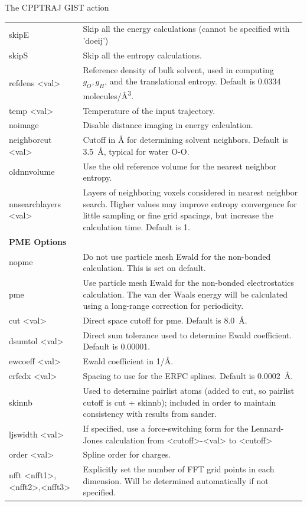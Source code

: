 \documentclass[9pt,tutorial,pubversion]{livecoms}
\begin{document}
\begin{Checklists*}[h!]
\begin{checklist}{The CPPTRAJ GIST action}
\begin{tabularx}{\textwidth}{@{}l X @{} }
skipE & Skip all the energy calculations (cannot be specified with 'doeij')\\
skipS & Skip all the entropy calculations.\\
refdens <val> & Reference density of bulk solvent, used in computing 
$g_O, g_H$, and the translational entropy. Default is 0.0334 molecules/\unit{\cubic\angstrom}. \\
temp <val> & Temperature of the input trajectory. \\
noimage &  Disable distance imaging in energy calculation. \\

neighborcut <val> & Cutoff in \unit{\angstrom} for determining solvent neighbors. Default is \qty{3.5}{\angstrom}, typical for water O-O. \\

oldnnvolume & Use the old reference volume for the nearest neighbor entropy. \\

nnsearchlayers <val> & Layers of neighboring voxels considered in nearest neighbor search. 
Higher values may improve entropy convergence for little sampling or fine grid spacings, but increase the calculation time. Default is 1. \\

\textbf{PME Options} & \\
nopme & Do not use particle mesh Ewald for the non-bonded calculation. This is set  on default. \\
pme & Use particle mesh Ewald for the non-bonded electrostatics calculation. The van der Waals energy will be calculated using a long-range correction for periodicity.\\
\qquad cut <val> & Direct space cutoff for pme. Default is \qty{8.0}{\angstrom}.\\
\qquad dsumtol <val> & Direct sum tolerance used to determine Ewald coefficient. Default is 0.00001.\\
\qquad ewcoeff <val> & Ewald coefficient in 1/Å. \\
\qquad erfcdx <val> & Spacing to use for the ERFC splines. Default is \qty{0.0002}{\angstrom}. \\
\qquad skinnb & Used to determine pairlist atoms (added to cut, so pairlist cutoff is cut + skinnb); included in order to maintain consistency with results from sander. \\
\qquad ljswidth <val> & If specified, use a force-switching form for the Lennard-Jones calculation from <cutoff>-<val> to <cutoff> \\
\qquad order <val> & Spline order for charges. \\
\qquad nfft <nfft1>,<nfft2>,<nfft3> & Explicitly set the
number of FFT grid points in each dimension.
Will be determined automatically if not
specified. \\

\end{tabularx}  
\end{checklist}
\end{Checklists*}
\end{document}
